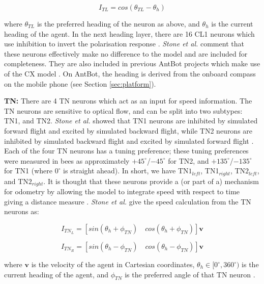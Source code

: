 \documentclass[a4paper,11pt,twoside,openright]{article}
\begin{document}
\begin{equation}
  I_{TL} = cos( \theta_{TL} - \theta_{h} )
\end{equation}

where $\theta_{TL} $ is the preferred heading of the neuron as above, and
$\theta_{h} $ is the current heading of the agent. In the next heading layer,
there are 16 CL1 neurons which use inhibition to invert the polarisation
response \cite{Stone2017}. \textit{Stone et al.} comment that these neurons
effectively make no difference to the model and are included for completeness.
They are also included in previous AntBot projects which make use of the CX model
\cite{Zhang2017, Scimeca2017}. On AntBot, the heading is derived from the onboard
compass on the mobile phone (see Section \ref{sec:platform}).
\newline
\par

\textbf{TN:}
There are 4 TN neurons which act as an input for speed information. The TN
neurons are sensitive to optical flow, and can be split into two subtypes:
TN1, and TN2. \textit{Stone et al.} showed that TN1 neurons are inhibited by
simulated forward flight and excited by simulated backward flight, while TN2
neurons are inhibited by simulated backward flight and excited by simulated
forward flight \cite{Stone2017}. Each of the four TN neurons has a tuning
preference; these tuning preferences were measured in bees as approximately
$+45^{\circ}$/$-45^{\circ}$ for TN2, and $+135^{\circ}$/$-135^{\circ}$ for TN1
(where $0^{\circ}$ is straight ahead). In short, we have TN$1_{left}$,
TN1$_{right}$, TN$2_{left}$, and TN$2_{right}$. It is thought that these neurons
provide a (or part of a) mechanism for odometry by allowing the model to
integrate speed with respect to time giving a distance measure \cite{Stone2017}.
\textit{Stone et al.} give the speed calculation from the TN neurons
as:

\begin{equation}
  I_{TN_{L}} =
  [ sin(\theta_{h} + \phi_{TN}) \quad cos(\theta_{h} + \phi_{TN}) ]\mathbf{v}
\end{equation}

\begin{equation}
  I_{TN_{R}} =
  [ sin(\theta_{h} - \phi_{TN}) \quad cos(\theta_{h} - \phi_{TN}) ]\mathbf{v}
\end{equation}

where $\mathbf{v}$ is the velocity of the agent in Cartesian coordinates,
$\theta_h \in [0^{\circ}, 360^{\circ})$ is the current heading of the agent, and
$\phi_{TN}$ is the preferred angle of that TN neuron \cite{Stone2017}.
\newline
\par
\end{document}

